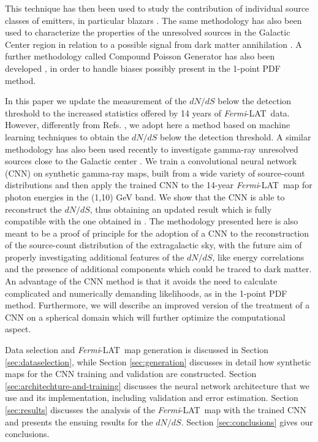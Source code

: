 \documentclass[a4paper,11pt]{article}
\newcommand{\fermi}{\textsl{Fermi}-LAT\ }
\begin{document}
This technique has then been used to study the contribution of individual source classes of emitters, in particular blazars \cite{Korsmeier:2022cwp,Manconi:2019ynl,DiMauro:2017ing,Zechlin:2017uzo}.
The same methodology has also been used to characterize the properties of the unresolved sources in the Galactic Center region in relation to a possible signal from dark matter annihilation \cite{Mishra-Sharma:2016gis,Bariuan:2022phe,Lee:2014mza,Lee:2015fea,Linden:2016rcf,Leane:2019xiy,Chang:2019ars,Buschmann:2020adf,Leane:2020nmi,Leane:2020pfc}.
{  A further methodology called Compound Poisson Generator has also been developed \cite{Collin:2021ufc}, in order to handle biases possibly present in the 1-point PDF method.}


In this paper we update the measurement of the $dN/dS$ below the detection threshold to the increased statistics offered by 14 years of \fermi data. However, differently from Refs. \cite{Cuoco-1pdf,Zechlin:2016pme}, we adopt here a method based on machine learning techniques to obtain the $dN/dS$ below the detection threshold. 
A similar methodology has also been used recently to investigate gamma-ray unresolved sources close to the Galactic center \cite{Mishra-Sharma:2021oxe,List:2021aer,List:2020mzd}.  
We train a convolutional neural network (CNN) on synthetic gamma-ray maps, built from a wide variety of source-count distributions and then apply the trained CNN to the  14-year \fermi map for photon energies in the (1,10) GeV band. We show that the CNN is able to reconstruct the $dN/dS$, thus obtaining an updated result which is fully compatible with the one obtained in \cite{Cuoco-1pdf}. The methodology presented here is also meant to be a proof of principle for the adoption of a CNN to the reconstruction of the source-count distribution of the extragalactic sky, with the future aim of properly investigating additional features of the $dN/dS$, like energy correlations and the presence of additional components which could be traced to dark matter.
{  An advantage of the CNN method is that it
avoids the need to calculate complicated and numerically demanding likelihoods, as in the 1-point PDF method.
Furthermore, we will describe an improved version of the treatment of a CNN on a spherical domain which will further optimize the computational aspect.}


Data selection and \fermi map generation is discussed in Section \ref{sec:dataselection}, while Section \ref{sec:generation} discusses in detail how synthetic maps for the CNN training and validation are constructed. Section \ref{sec:architechture-and-training} discusses the neural network architecture that we use and its implementation, including validation and error estimation. Section \ref{sec:results} discusses the analysis of the \fermi map with the trained CNN and presents the ensuing results for the $dN/dS$. Section \ref{sec:conclusions} gives our conclusions.
\end{document}
